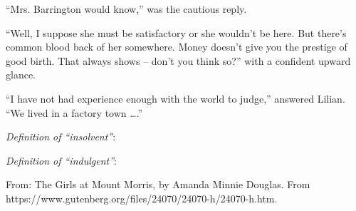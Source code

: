 \begin{enumerate}
\begin{linenumbers}
``Mrs. Barrington would know,'' was the cautious reply.

``Well, I suppose she must be satisfactory or she wouldn't be here. But there's common blood back of her somewhere. Money doesn't give you the prestige of good birth. That always shows -- don't you think so?'' with a confident upward glance.

``I have not had experience enough with the world to judge,'' answered Lilian. ``We lived in a factory town \ldots.''

\end{linenumbers}

\textit{Definition of ``insolvent''}: \hrulefill

\hrulefill

\textit{Definition of ``indulgent''}: \hrulefill

\hrulefill

From: The Girls at Mount Morris, by Amanda Minnie Douglas. From \sloppy https://www.gutenberg.org/files/24070/24070-h/24070-h.htm.
\end{enumerate}